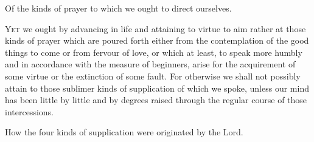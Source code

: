 
Of the kinds of prayer to which we ought to direct ourselves.

\textsc{Yet} we ought by advancing in life and attaining to virtue to aim rather at those kinds of prayer which are poured forth either from the contemplation of the good things to come or from fervour of love, or which at least, to speak more humbly and in accordance with the measure of beginners, arise for the acquirement of some virtue or the extinction of some fault. For otherwise we shall not possibly attain to those sublimer kinds of supplication of which we spoke, unless our mind has been little by little and by degrees raised through the regular course of those intercessions.


How the four kinds of supplication were originated by the Lord.

